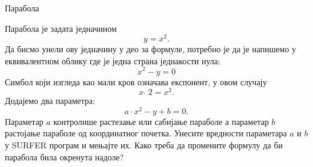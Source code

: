 \documentclass[sr]{./../../common/SurferDesc}%
\begin{document}
\footnotesize
%
\begin{surferPage}
  \begin{surferTitle}Парабола\end{surferTitle}
   \begin{surferText}
   
Парабола је задата једначином  \[y=x^2.\]
Да бисмо унели ову једначину у део за формуле, потребно је да је напишемо у еквивалентном облику где је једна страна једнакости нула:
\[x^2-y=0\]
Симбол који изгледа као мали кров означава експонент, у овом случају  
\[ x  \,\hat{\ } \, 2 =x^2.\]
Додајемо два параметра:
\[a \cdot x^2-y+b=0.\]
Параметар $a$ контролише растезање или сабијање параболе а параметар  $b$ растојање параболе од координатног почетка.
\newline
Унесите вредности параметара  $a$ и $b$ у SURFER програм и мењајте их. Како треба да промените формулу да би парабола била окренута надоле?
\end{surferText}
\end{surferPage}
\end{document}
